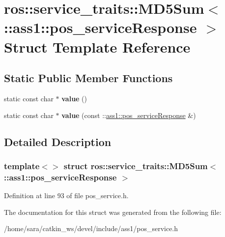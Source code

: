 \hypertarget{structros_1_1service__traits_1_1MD5Sum_3_01_1_1ass1_1_1pos__serviceResponse_01_4}{}\section{ros\+:\+:service\+\_\+traits\+:\+:M\+D5\+Sum$<$ \+:\+:ass1\+:\+:pos\+\_\+service\+Response $>$ Struct Template Reference}
\label{structros_1_1service__traits_1_1MD5Sum_3_01_1_1ass1_1_1pos__serviceResponse_01_4}
\subsection*{Static Public Member Functions}
\begin{DoxyCompactItemize}
\item 
\mbox{\label{structros_1_1service__traits_1_1MD5Sum_3_01_1_1ass1_1_1pos__serviceResponse_01_4_adcc0f083c9fa307ae1c02ffea340bed9}} 
static const char $\ast$ {\bfseries value} ()
\item 
\mbox{\label{structros_1_1service__traits_1_1MD5Sum_3_01_1_1ass1_1_1pos__serviceResponse_01_4_a322179fdc63123f7c420b7c59fbcdb80}} 
static const char $\ast$ {\bfseries value} (const \+::\hyperlink{structass1_1_1pos__serviceResponse__}{ass1\+::pos\+\_\+service\+Response} \&)
\end{DoxyCompactItemize}


\subsection{Detailed Description}
\subsubsection*{template$<$$>$\newline
struct ros\+::service\+\_\+traits\+::\+M\+D5\+Sum$<$ \+::ass1\+::pos\+\_\+service\+Response $>$}



Definition at line 93 of file pos\+\_\+service.\+h.



The documentation for this struct was generated from the following file\+:\begin{DoxyCompactItemize}
\item 
/home/sara/catkin\+\_\+ws/devel/include/ass1/pos\+\_\+service.\+h\end{DoxyCompactItemize}
